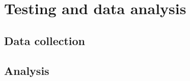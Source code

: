 \chapter{Testing and data analysis}\label{sec:TestingAndDataAnalysis}

\section{Data collection}
\label{sec:DataCollection}

\section{Analysis}
\label{sec:Analysis}